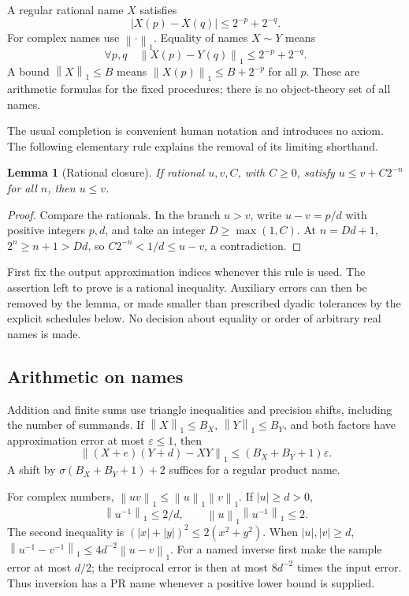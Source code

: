 \documentclass[11pt]{article}
\newtheorem{lemma}[theorem]{Lemma}
\theoremstyle{definition}
\newcommand{\norm}[1]{\left\lVert#1\right\rVert_1}
\begin{document}
A regular rational name \(X\) satisfies
\begin{equation}\label{eq:regular}
 |X(p)-X(q)|\le2^{-p}+2^{-q}.
\end{equation}
For complex names use \(\norm{\cdot}\). Equality of names \(X\sim Y\)
means
\begin{equation}\label{eq:nameeq}
 \forall p,q\quad\norm{X(p)-Y(q)}\le2^{-p}+2^{-q}.
\end{equation}
A bound \(\norm X\le B\) means
\(\norm{X(p)}\le B+2^{-p}\) for all \(p\).
These are arithmetic formulas for the fixed procedures; there is no
object-theory set of all names.

The usual completion is convenient human notation and introduces no axiom.
The following elementary rule explains the removal of its limiting
shorthand.

\begin{lemma}[Rational closure]\label{lem:closure}
If rational \(u,v,C\), with \(C\ge0\), satisfy \(u\le v+C2^{-n}\) for all
\(n\), then \(u\le v\).
\end{lemma}
\begin{proof}
Compare the rationals. In the branch \(u>v\), write \(u-v=p/d\) with
positive integers \(p,d\), and take an integer \(D\ge\max(1,C)\).
At \(n=Dd+1\), \(2^n\ge n+1>Dd\), so
\(C2^{-n}<1/d\le u-v\), a contradiction.
\end{proof}

First fix the output approximation indices whenever this rule is used.
The assertion left to prove is a rational inequality. Auxiliary errors
can then be removed by the lemma, or made smaller than prescribed
dyadic tolerances by the explicit schedules below.
No decision about equality or order of arbitrary real names is made.

\subsection{Arithmetic on names}

Addition and finite sums use triangle inequalities and precision shifts,
including the number of summands. If \(\norm X\le B_X\), \(\norm Y\le B_Y\),
and both factors have approximation error at most \(\varepsilon\le1\),
then
\begin{equation}\label{eq:producterror}
 \norm{(X+e)(Y+d)-XY}\le(B_X+B_Y+1)\varepsilon.
\end{equation}
A shift by \(\sigma(B_X+B_Y+1)+2\) suffices for a regular product name.

For complex numbers, \(\norm{uv}\le\norm u\norm v\). If \(|u|\ge d>0\),
\begin{equation}\label{eq:inverse}
 \norm{u^{-1}}\le2/d,\qquad \norm u\norm{u^{-1}}\le2.
\end{equation}
The second inequality is
\((|x|+|y|)^2\le2(x^2+y^2)\).
When \(|u|,|v|\ge d\),
\(\norm{u^{-1}-v^{-1}}\le4d^{-2}\norm{u-v}\).
For a named inverse first make the sample error at most \(d/2\);
the reciprocal error is then at most \(8d^{-2}\) times the input error.
Thus inversion has a PR name whenever a positive lower bound is supplied.
\end{document}
